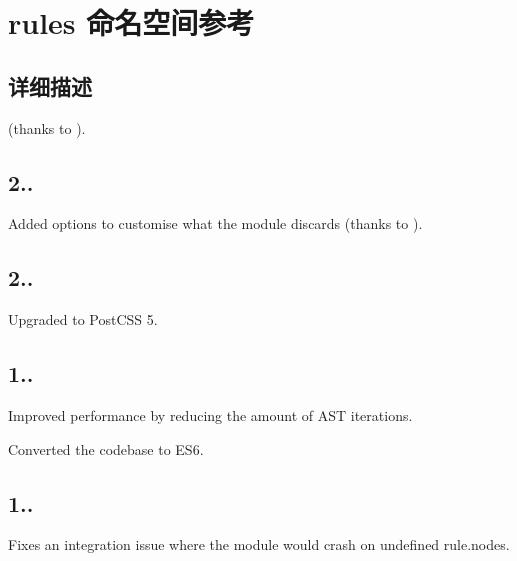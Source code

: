\hypertarget{namespacerules}{}\section{rules 命名空间参考}
\label{namespacerules}


\subsection{详细描述}
(thanks to ).

\subsection*{2..}


\begin{DoxyItemize}
\item Added options to customise what the module discards (thanks to ).
\end{DoxyItemize}

\subsection*{2..}


\begin{DoxyItemize}
\item Upgraded to Post\+C\+SS 5.
\end{DoxyItemize}

\subsection*{1..}


\begin{DoxyItemize}
\item Improved performance by reducing the amount of A\+ST iterations.
\item Converted the codebase to E\+S6.
\end{DoxyItemize}

\subsection*{1..}


\begin{DoxyItemize}
\item Fixes an integration issue where the module would crash on {\ttfamily undefined} {\ttfamily rule.\+nodes}.
\end{DoxyItemize}

